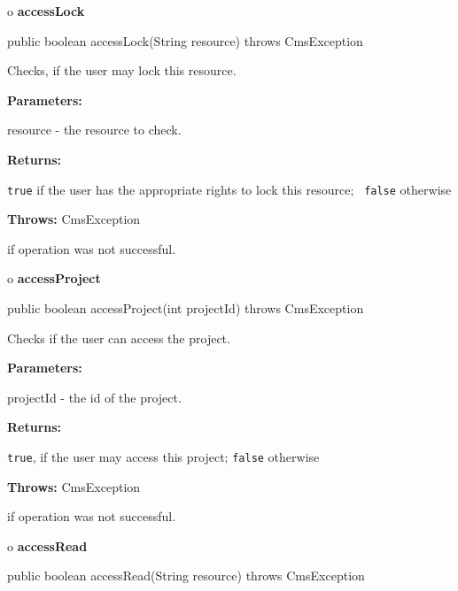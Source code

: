 o {\bf accessLock}

\begin{PRE}
 public boolean accessLock(String resource) throws CmsException
\end{PRE}

\begin{description}
\htmlDD Checks, if the user may lock this resource.

\begin{description}
\item {\bf Parameters:}

resource - the resource to check.
\item {\bf Returns:}

{\tt true} if the user has the appropriate rights to lock this resource; {\tt
false} otherwise
\item {\bf Throws:} CmsException

if operation was not successful.
\end{description}

\end{description}

o {\bf accessProject}

\begin{PRE}
 public boolean accessProject(int projectId) throws CmsException
\end{PRE}

\begin{description}
\htmlDD Checks if the user can access the project.

\begin{description}
\item {\bf Parameters:}

projectId - the id of the project.
\item {\bf Returns:}

{\tt true}, if the user may access this project; {\tt false} otherwise
\item {\bf Throws:} CmsException

if operation was not successful.
\end{description}

\end{description}

o {\bf accessRead}

\begin{PRE}
 public boolean accessRead(String resource) throws CmsException
\end{PRE}

